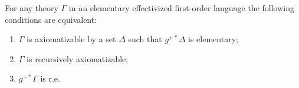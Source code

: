 For any theory $\Gamma$ in an elementary effectivized first-order language the following conditions are equivalent:

\begin{enumerate}
\item[(i)] $\Gamma$ is axiomatizable by a set $\Delta$ such that $g^{+*}\Delta$ is elementary;
\item[(ii)] $\Gamma$ is recursively axiomatizable;
\item[(iii)] $g^{+*}\Gamma$ is r.e.
\end{enumerate}
